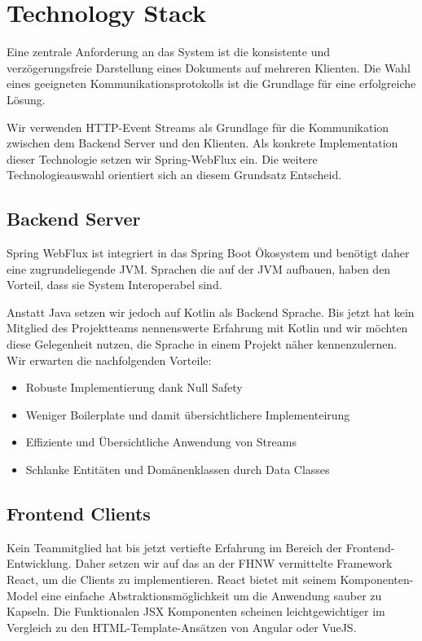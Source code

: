 \section{Technology Stack}

Eine zentrale Anforderung an das System ist die konsistente und verzögerungsfreie Darstellung eines Dokuments auf mehreren Klienten.
Die Wahl eines geeigneten Kommunikationsprotokolls ist die Grundlage für eine erfolgreiche Lösung.

Wir verwenden HTTP-Event Streams als Grundlage für die Kommunikation zwischen dem Backend Server und den Klienten.
Als konkrete Implementation dieser Technologie setzen wir Spring-WebFlux ein.
Die weitere Technologieauswahl orientiert sich an diesem Grundsatz Entscheid.

\subsection{Backend Server}
Spring WebFlux ist integriert in das Spring Boot Ökosystem und benötigt daher eine zugrundeliegende JVM\@.
Sprachen die auf der JVM aufbauen, haben den Vorteil, dass sie System Interoperabel sind.

Anstatt Java setzen wir jedoch auf Kotlin als Backend Sprache.
Bis jetzt hat kein Mitglied des Projektteams nennenswerte Erfahrung mit Kotlin und wir möchten diese Gelegenheit nutzen,
die Sprache in einem Projekt näher kennenzulernen.
Wir erwarten die nachfolgenden Vorteile: 

\begin{itemize}
    \item Robuste Implementierung dank Null Safety
    \item Weniger Boilerplate und damit übersichtlichere Implementeirung
    \item Effiziente und Übersichtliche Anwendung von Streams
    \item Schlanke Entitäten und Domänenklassen durch Data Classes
\end{itemize}


\subsection{Frontend Clients}
Kein Teammitglied hat bis jetzt vertiefte Erfahrung im Bereich der Frontend-Entwicklung.
Daher setzen wir auf das an der FHNW vermittelte Framework React, um die Clients zu implementieren.
React bietet mit seinem Komponenten-Model eine einfache Abstraktionsmöglichkeit um die Anwendung sauber zu Kapseln.
Die Funktionalen JSX Komponenten scheinen leichtgewichtiger im Vergleich zu den HTML-Template-Ansätzen von Angular oder VueJS\@.

